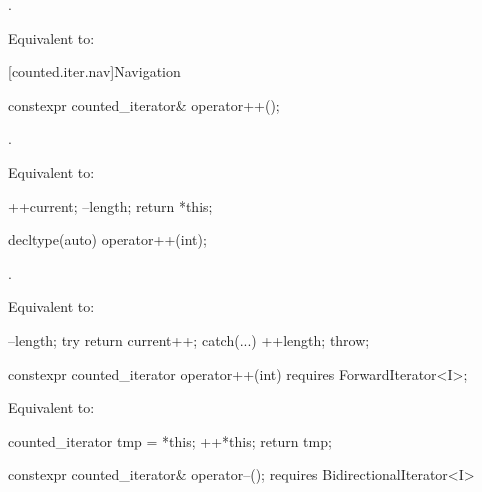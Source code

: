 \begin{itemdescr}
\pnum
\expects {}.

\pnum
\effects Equivalent to: 
\end{itemdescr}

[counted.iter.nav]{Navigation}

%
\begin{itemdecl}
constexpr counted_iterator& operator++();
\end{itemdecl}

\begin{itemdescr}
\pnum
\expects {}.

\pnum
\effects Equivalent to:
\begin{codeblock}
++current;
--length;
return *this;
\end{codeblock}
\end{itemdescr}

%
\begin{itemdecl}
decltype(auto) operator++(int);
\end{itemdecl}

\begin{itemdescr}
\pnum
\expects {}.

\pnum
\effects Equivalent to:
\begin{codeblock}
--length;
try { return current++; }
catch(...) { ++length; throw; }
\end{codeblock}
\end{itemdescr}

%
\begin{itemdecl}
constexpr counted_iterator operator++(int)
  requires ForwardIterator<I>;
\end{itemdecl}

\begin{itemdescr}
\pnum
\effects Equivalent to:
\begin{codeblock}
counted_iterator tmp = *this;
++*this;
return tmp;
\end{codeblock}
\end{itemdescr}

%
\begin{itemdecl}
  constexpr counted_iterator& operator--();
    requires BidirectionalIterator<I>
\end{itemdecl}

